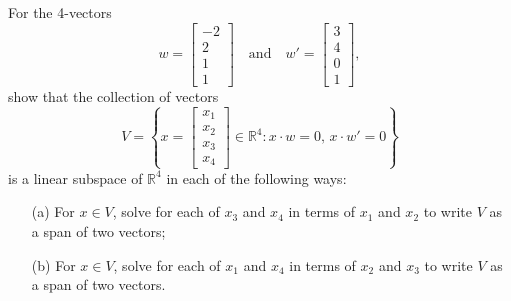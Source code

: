 For the 4-vectors 
\[
w = 
\begin{bmatrix}
-2 \\
2 \\
1 \\
1
\end{bmatrix}
\quad \text{and} \quad
w' = 
\begin{bmatrix}
3 \\
4 \\
0 \\
1
\end{bmatrix},
\]
show that the collection of vectors
\[
V = \left\{ 
x = 
\begin{bmatrix}
x_1 \\
x_2 \\
x_3 \\
x_4
\end{bmatrix} 
\in \mathbb{R}^4 : x \cdot w = 0, \, x \cdot w' = 0
\right\}
\]
is a linear subspace of $\mathbb{R}^4$ in each of the following ways:

\begin{enumerate}
    \item[(a)] For $x \in V$, solve for each of $x_3$ and $x_4$ in terms of $x_1$ and $x_2$ to write $V$ as a span of two vectors;
    \item[(b)] For $x \in V$, solve for each of $x_1$ and $x_4$ in terms of $x_2$ and $x_3$ to write $V$ as a span of two vectors.
\end{enumerate}

